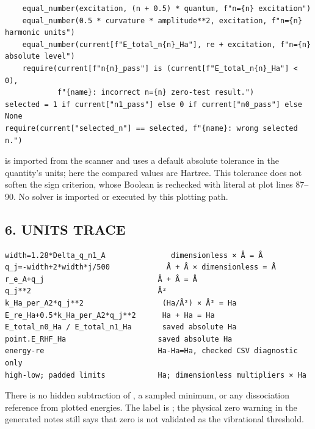 \documentclass[10pt,a4paper]{article}
\begin{document}
\begin{Verbatim}
    equal_number(excitation, (n + 0.5) * quantum, f"n={n} excitation")
    equal_number(0.5 * curvature * amplitude**2, excitation, f"n={n} harmonic units")
    equal_number(current[f"E_total_n{n}_Ha"], re + excitation, f"n={n} absolute level")
    require(current[f"n{n}_pass"] is (current[f"E_total_n{n}_Ha"] < 0),
            f"{name}: incorrect n={n} zero-test result.")
selected = 1 if current["n1_pass"] else 0 if current["n0_pass"] else None
require(current["selected_n"] == selected, f"{name}: wrong selected n.")
\end{Verbatim}
 is imported from the scanner and uses a default absolute tolerance  in the quantity's units; here the compared values are Hartree. This tolerance does not soften the sign criterion, whose Boolean is rechecked with literal  at plot lines 87–90. No solver is imported or executed by this plotting path.

\subsection{6. UNITS TRACE}
\begin{Verbatim}
width=1.28*Delta_q_n1_A               dimensionless × Å = Å
q_j=-width+2*width*j/500             Å + Å × dimensionless = Å
r_e_A+q_j                          Å + Å = Å
q_j**2                             Å²
k_Ha_per_A2*q_j**2                  (Ha/Å²) × Å² = Ha
E_re_Ha+0.5*k_Ha_per_A2*q_j**2      Ha + Ha = Ha
E_total_n0_Ha / E_total_n1_Ha       saved absolute Ha
point.E_RHF_Ha                     saved absolute Ha
energy-re                          Ha-Ha=Ha, checked CSV diagnostic only
high-low; padded limits            Ha; dimensionless multipliers × Ha
\end{Verbatim}
There is no hidden subtraction of , a sampled minimum, or any dissociation reference from plotted energies. The label is ; the physical zero warning in the generated notes still says that zero is not validated as the vibrational threshold.
\end{document}
